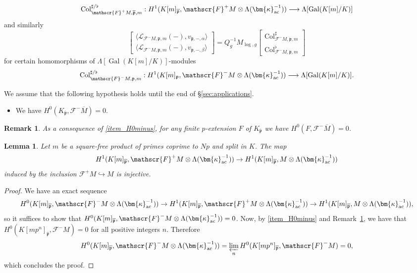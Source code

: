 \documentclass{amsart}
\makeatletter
\numberwithin{equation}{section}
\newcommand{\mylabel}[2]{#2\def\@currentlabel{#2}\label{#1}}
\newtheorem{lemma}[theorem]{Lemma}
\newtheorem{remark}[theorem]{Remark}
\newcommand{\frk}{\mathfrak}
\newcommand{\Gal}{\operatorname{Gal}}
\newcommand{\col}{\mathrm{Col}}
\newcommand{\ac}{\textup{ac}}
\makeatother
\begin{document}
\[
\col_{\mathscr{F}^+ M,\overline{\frk{p}},m}^{\sharp/\flat}:H^1(K[m]_{\overline{\frk{p}}},\mathscr{F}^+ M\otimes \Lambda(\bm{\kappa}_{\ac}^{-1}))\longrightarrow \Lambda[\Gal(K[m]/K)]
\]
and similarly
\begin{equation}
\begin{bmatrix}
    \langle \mathcal{L}_{\mathscr{F}^- M,\frk{p},m}(-),v_{\frk{p},-,\alpha}\rangle \\
    \langle \mathcal{L}_{\mathscr{F}^- M,\frk{p},m}(-),v_{\frk{p},-,\beta}\rangle
\end{bmatrix}
= Q_g^{-1}M_{\log,g}
\begin{bmatrix}
    \col_{\mathscr{F}^- M,\frk{p},m}^{\sharp} \\
    \col_{\mathscr{F}^- M,\frk{p},m}^{\flat}
\end{bmatrix}
\label{eq:Col-decompo-}    
\end{equation}
for certain homomorphisms of $\Lambda[\Gal(K[m]/K)]$-modules
\[
\col_{\mathscr{F}^- M,\frk{p},m}^{\sharp/\flat}:H^1(K[m]_{\frk{p}},\mathscr{F}^- M\otimes \Lambda(\bm{\kappa}_{\ac}^{-1}))\longrightarrow \Lambda[\Gal(K[m]/K)].
\]

We assume that the following hypothesis holds until the end of \S\ref{sec:applications}.
\begin{itemize}
        \item[(\mylabel{item_H0minus}{\textbf{H}$^0_-$})]     We have  $H^0(K_{\overline{\frk{p}}},\mathscr{F}^-\overline{M})=0$.
    \end{itemize}


\begin{remark}\label{rk:irred2}
    As a consequence of \eqref{item_H0minus}, for any finite $p$-extension $F$ of $K_{\overline{\frk{p}}}$ we have $H^0(F,\mathscr{F}^-\overline{M})=0$.
\end{remark}

\begin{lemma}
    Let $m$ be a square-free product of primes coprime to $Np$ and split in $K$. The map
    \[
    H^1(K[m]_{\overline{\frk{p}}},\mathscr{F}^+M\otimes \Lambda(\bm{\kappa}_{\ac}^{-1}))\rightarrow H^1(K[m]_{\overline{\frk{p}}},M\otimes \Lambda(\bm{\kappa}_{\ac}^{-1}))
    \]
    induced by the inclusion $\mathscr{F}^+M\hookrightarrow M$ is injective.
\end{lemma}
\begin{proof}
    We have an exact sequence
    \[
    H^0(K[m]_{\overline{\frk{p}}},\mathscr{F}^-M\otimes \Lambda(\bm{\kappa}_{\ac}^{-1}))\rightarrow H^1(K[m]_{\overline{\frk{p}}},\mathscr{F}^+M\otimes \Lambda(\bm{\kappa}_{\ac}^{-1}))\rightarrow H^1(K[m]_{\overline{\frk{p}}},M\otimes \Lambda(\bm{\kappa}_{\ac}^{-1})), 
    \]
    so it suffices to show that $H^0(K[m]_{\overline{\frk{p}}},\mathscr{F}^-M\otimes \Lambda(\bm{\kappa}_{\ac}^{-1}))=0$. Now, by \eqref{item_H0minus} and Remark~\ref{rk:irred2}, we have that $H^0(K[mp^n]_{\overline{\frk{p}}},\mathscr{F}^-M)=0$ for all positive integers $n$. Therefore
    \[
    H^0(K[m]_{\overline{\frk{p}}},\mathscr{F}^-M\otimes \Lambda(\bm{\kappa}_{\ac}^{-1}))=\varprojlim_n H^0(K[mp^n]_{\overline{\frk{p}}},\mathscr{F}^-M)=0,
    \]
    which concludes the proof.
\end{proof}
\end{document}
